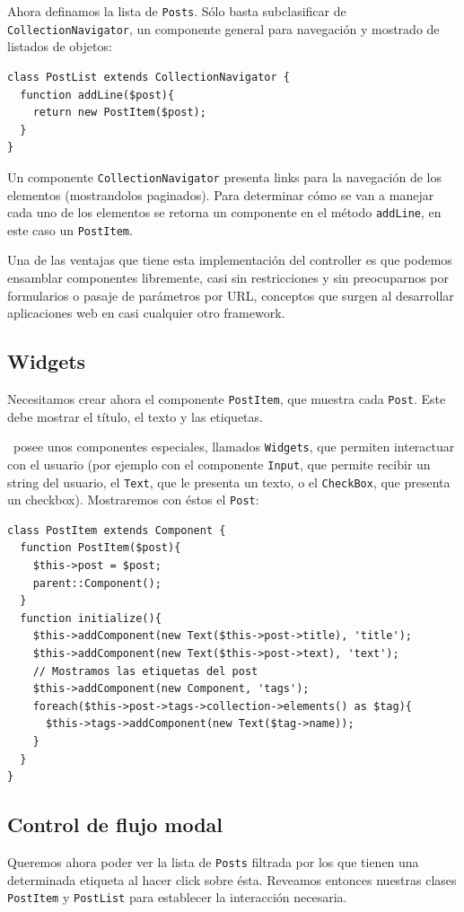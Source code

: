 Ahora definamos la lista de \verb"Posts". Sólo basta subclasificar de \verb"CollectionNavigator", un componente general para navegación y mostrado de listados de objetos:

\begin{verbatim}
class PostList extends CollectionNavigator {
  function addLine($post){
    return new PostItem($post);
  }
}

\end{verbatim}

Un componente \verb"CollectionNavigator" presenta links para la navegación de los elementos (mostrandolos paginados). Para determinar cómo se van a manejar cada uno de los elementos se retorna un componente en el método \verb"addLine", en este caso un \verb'PostItem'.

Una de las ventajas que tiene esta implementación del controller es que podemos ensamblar componentes libremente, casi sin restricciones y sin preocuparnos por formularios o pasaje de parámetros por URL, conceptos que surgen al desarrollar aplicaciones web en casi cualquier otro framework.

\subsection{Widgets}
\label{sub-widget}

Necesitamos crear ahora el componente \verb'PostItem', que muestra cada \verb'Post'. Este debe mostrar el título, el texto y las etiquetas.

\PWB\ posee unos componentes especiales, llamados \verb"Widgets"\cite{WDGTS}, que permiten interactuar con el usuario (por ejemplo con el componente \verb"Input", que permite recibir un string del usuario, el \verb"Text", que le presenta un texto, o el \verb"CheckBox", que presenta un checkbox). Mostraremos con éstos el \verb'Post':

\begin{verbatim}
class PostItem extends Component {
  function PostItem($post){
    $this->post = $post;
    parent::Component();
  }
  function initialize(){
    $this->addComponent(new Text($this->post->title), 'title');
    $this->addComponent(new Text($this->post->text), 'text');
    // Mostramos las etiquetas del post
    $this->addComponent(new Component, 'tags');
    foreach($this->post->tags->collection->elements() as $tag){
      $this->tags->addComponent(new Text($tag->name));
    }
  }
}
\end{verbatim}

\subsection{Control de flujo modal}
\label{sub-modal-flow}
Queremos ahora poder ver la lista de \verb"Posts" filtrada por los que tienen una determinada etiqueta al hacer click sobre ésta. Reveamos entonces nuestras clases \verb"PostItem" y \verb"PostList" para establecer la interacción necesaria.

